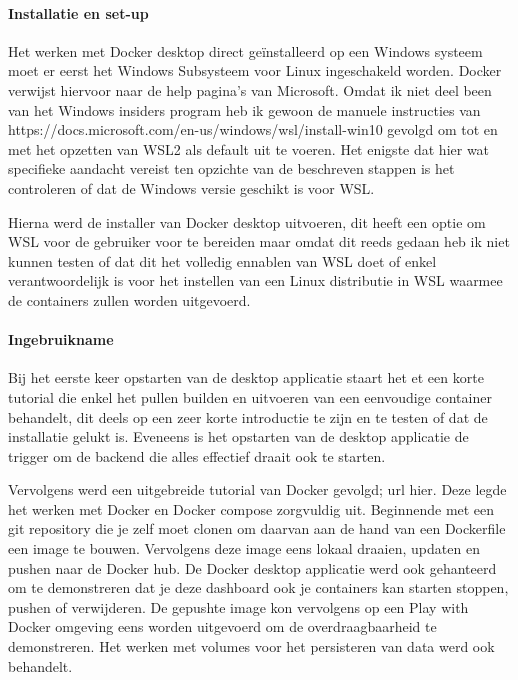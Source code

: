 \begin{itemize}
\paragraph{Installatie en set-up}
Het werken met Docker desktop direct geïnstalleerd op een Windows systeem moet er eerst het Windows Subsysteem voor Linux ingeschakeld worden. Docker verwijst hiervoor naar de help pagina’s van Microsoft. Omdat ik niet deel been van het Windows insiders program heb ik gewoon de manuele instructies van https://docs.microsoft.com/en-us/windows/wsl/install-win10 gevolgd om tot en met het opzetten van WSL2 als default uit te voeren. Het enigste dat hier wat specifieke aandacht vereist ten opzichte van de beschreven stappen is het controleren of dat de Windows versie geschikt is voor WSL.

Hierna werd de installer van Docker desktop uitvoeren, dit heeft een optie om WSL voor de gebruiker voor te bereiden maar omdat dit reeds gedaan heb ik niet kunnen testen of dat dit het volledig ennablen van WSL doet of enkel verantwoordelijk is voor het instellen van een Linux distributie in WSL waarmee de containers zullen worden uitgevoerd.

\paragraph{Ingebruikname}
Bij het eerste keer opstarten van de desktop applicatie staart het et een korte tutorial die enkel het pullen builden en uitvoeren van een eenvoudige container behandelt,  dit deels op een zeer korte introductie te zijn en te testen of dat de installatie gelukt is. Eveneens is het opstarten van de desktop applicatie de trigger om de backend die alles effectief draait ook te starten.

Vervolgens werd een uitgebreide tutorial van Docker gevolgd; url hier. Deze legde het werken met Docker en Docker compose zorgvuldig uit. Beginnende met een git repository die je zelf moet clonen om daarvan aan de hand van een Dockerfile een image te bouwen. Vervolgens deze image eens lokaal draaien, updaten en pushen naar de Docker hub. De Docker desktop applicatie werd ook gehanteerd om te demonstreren dat je deze dashboard ook je containers kan starten stoppen, pushen of verwijderen. De gepushte image kon vervolgens op een Play with Docker omgeving eens worden uitgevoerd om de overdraagbaarheid te demonstreren. Het werken met volumes voor het persisteren van data werd ook behandelt.


\end{itemize}
